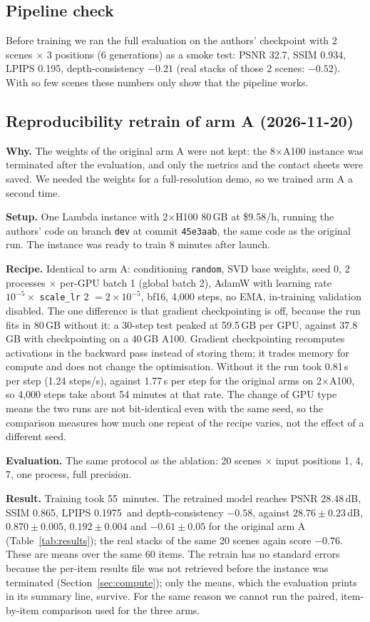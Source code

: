\documentclass[11pt]{article}
\newcommand{\RetrainPSNR}{28.48}      %
\newcommand{\RetrainSSIM}{0.865}
\newcommand{\RetrainLPIPS}{0.1975}
\newcommand{\RetrainRho}{$-0.58$}       %
\newcommand{\RetrainTrainMin}{55}  %
\begin{document}
\subsection{Pipeline check}
Before training we ran the full evaluation on the authors' checkpoint with 2 scenes $\times$ 3 positions (6 generations) as a smoke test: PSNR 32.7, SSIM 0.934, LPIPS 0.195, depth-consistency $-0.21$ (real stacks of those 2 scenes: $-0.52$). With so few scenes these numbers only show that the pipeline works.

\subsection{Reproducibility retrain of arm A (2026-11-20)}\label{sec:retrain}
\textbf{Why.} The weights of the original arm A were not kept: the 8$\times$A100 instance was terminated after the evaluation, and only the metrics and the contact sheets were saved. We needed the weights for a full-resolution demo, so we trained arm A a second time.

\textbf{Setup.} One Lambda instance with 2$\times$H100 80\,GB at \$9.58/h, running the authors' code on branch \texttt{dev} at commit \texttt{45e3aab}, the same code as the original run. The instance was ready to train 8 minutes after launch.

\textbf{Recipe.} Identical to arm A: conditioning \texttt{random}, SVD base weights, seed 0, 2 processes $\times$ per-GPU batch 1 (global batch 2), AdamW with learning rate $10^{-5}\times$ \texttt{scale\_lr} 2 $=2\times10^{-5}$, bf16, 4{,}000 steps, no EMA, in-training validation disabled.
The one difference is that gradient checkpointing is off, because the run fits in 80\,GB without it: a 30-step test peaked at 59.5\,GB per GPU, against 37.8\,GB with checkpointing on a 40\,GB A100. Gradient checkpointing recomputes activations in the backward pass instead of storing them; it trades memory for compute and does not change the optimisation. Without it the run took 0.81\,s per step (1.24 steps/s), against 1.77\,s per step for the original arms on 2$\times$A100, so 4{,}000 steps take about 54 minutes at that rate.
The change of GPU type means the two runs are not bit-identical even with the same seed, so the comparison measures how much one repeat of the recipe varies, not the effect of a different seed.

\textbf{Evaluation.} The same protocol as the ablation: 20 scenes $\times$ input positions 1, 4, 7, one process, full precision.

\textbf{Result.} Training took \RetrainTrainMin\ minutes. The retrained model reaches PSNR \RetrainPSNR\,dB, SSIM \RetrainSSIM, LPIPS \RetrainLPIPS\ and depth-consistency \RetrainRho, against $28.76\pm0.23$\,dB, $0.870\pm0.005$, $0.192\pm0.004$ and $-0.61\pm0.05$ for the original arm A (Table~\ref{tab:results}); the real stacks of the same 20 scenes again score $-0.76$.
These are means over the same 60 items. The retrain has no standard errors because the per-item results file was not retrieved before the instance was terminated (Section~\ref{sec:compute}); only the means, which the evaluation prints in its summary line, survive. For the same reason we cannot run the paired, item-by-item comparison used for the three arms.
\end{document}
